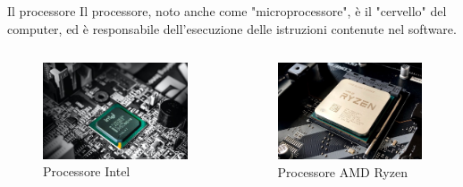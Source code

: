 \begin{frame}
	
	\begin{block}{Il processore}
		Il processore, noto anche come "microprocessore", è il "cervello" del computer, ed è responsabile dell'esecuzione delle istruzioni contenute nel software.
	\end{block}

	\begin{columns}			
		\begin{figure}[!htbp] 
			\centering
			\includegraphics[width=1.0\linewidth]{images/2_le_architetture/intel.jpg}
			\caption{Processore Intel}
			\label{fig:architectures_intel}
		\end{figure}
					
		\begin{figure}[!htbp] 
			\centering
			\includegraphics[width=1.0\linewidth]{images/2_le_architetture/ryzen.jpg}
			\caption{Processore AMD Ryzen}
			\label{fig:architectures_ryzen}
		\end{figure}
		
	\end{columns}
	
\end{frame}




